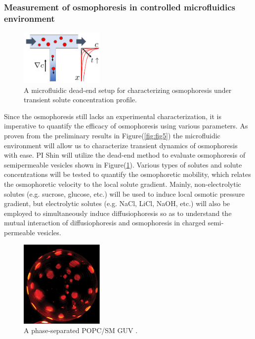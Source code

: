 \documentclass[11pt]{article}
\begin{document}
\subsubsection{Measurement of osmophoresis in controlled microfluidics environment\label{subsubsec:measurement_osmophoresis}}
\begin{figure}
\centerline{\includegraphics[width=1.6in]{figs/Microfluidic_dead-end.pdf}}
\caption{\footnotesize A microfluidic dead-end setup for characterizing osmophoresis under transient solute concentration profile.}
\label{fig:Microfluidic_dead-end}
\end{figure}
%
Since the osmophoresis still lacks an experimental characterization, it is imperative to 
quantify the efficacy of osmophoresis using various parameters. As proven from the preliminary results in Figure(\ref{fig:fig5}) 
the microfluidic environment will allow us to characterize transient dynamics of osmophoresis with ease. 
PI Shin will utilize the dead-end method to evaluate osmophoresis of semipermeable vesicles shown in Figure(\ref{fig:Microfluidic_dead-end}). 
Various types of solutes and solute concentrations will be tested to quantify the osmophoretic mobility, which relates the osmophoretic velocity to the local solute gradient. 
Mainly, non-electrolytic solutes (e.g. sucrose, glucose, etc.) will be used to induce local osmotic pressure gradient, but electrolytic solutes (e.g. NaCl, LiCl, NaOH, etc.) will also be employed to simultaneously induce diffusiophoresis so as to understand the mutual interaction of diffusiophoresis and osmophoresis in charged semi-permeable vesicles.

\begin{figure}
\vspace*{-10pt}
\centerline{\includegraphics[width=1.6in]{figs/phase-separatedGUV.pdf}}
\caption{\footnotesize A phase-separated POPC/SM GUV  \cite{oglkecka2014}. 
}
\label{fig:phase-separatedGUV}
\end{figure}
%
\end{document}
